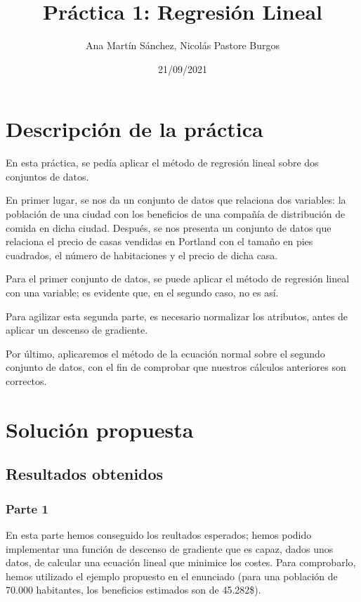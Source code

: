 \documentclass[11pt]{article}
\title{Práctica 1: Regresión Lineal}
\author{Ana Martín Sánchez, Nicolás Pastore Burgos}
\date{21/09/2021}
\begin{document}
\maketitle

\section{Descripción de la práctica}

 En esta práctica, se pedía aplicar el método de regresión lineal sobre dos conjuntos de datos. 
 
 En primer lugar, se nos da un conjunto de datos que relaciona dos variables: la población de una ciudad con los beneficios de una compañía de distribución de comida en dicha ciudad.
 Después, se nos presenta un conjunto de datos que relaciona el precio de casas vendidas en Portland con el tamaño en pies cuadrados, el número de habitaciones y el precio de dicha casa.

 Para el primer conjunto de datos, se puede aplicar el método de regresión lineal con una variable; es evidente que, en el segundo caso, no es así.

 Para agilizar esta segunda parte, es necesario normalizar los atributos, antes de aplicar un descenso de gradiente.

 Por último, aplicaremos el método de la ecuación normal sobre el segundo conjunto de datos, con el fin de comprobar que nuestros cálculos anteriores son correctos.


\newpage
\section{Solución propuesta}

\subsection{Resultados obtenidos}

\subsubsection {Parte 1}

En esta parte hemos conseguido los reultados esperados; hemos podido implementar una función de descenso de gradiente que es capaz, dados unos datos, de calcular una ecuación lineal que minimice los costes. Para comprobarlo, hemos utilizado el ejemplo propuesto en el enunciado (para una población de 70.000 habitantes, los beneficios estimados son de 45.282\$). 
\end{document}
